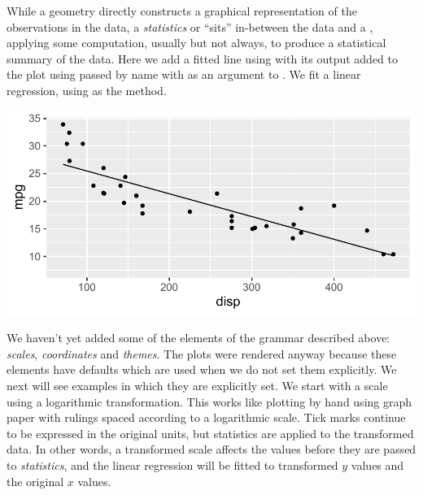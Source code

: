 \documentclass[krantz2]{krantz}\usepackage{knitr}
\begin{document}
While a geometry directly constructs a graphical representation of the observations in the data, a \emph{statistics} or  ``sits'' in-between the data and a , applying some computation, usually but not always, to produce a statistical summary of the data. Here we add a fitted line using  with its output added to the plot using  passed by name with  as an argument to . We fit a linear regression, using  as the method.

\begin{knitrout}\footnotesize
{}\color{fgcolor}\begin{kframe}
\begin{alltt}
\hlstd{(} 
       \hlstd{(}    \hlopt{+}
  \hlstd{()} \hlopt{+}
  \hlstd{(} \hlstd{=} \hlstd{,}  \hlstd{=} \hlstd{,}   \hlopt{~} 
\end{alltt}
\end{kframe}

{\centering \includegraphics[width=.7\textwidth]{figure/pos-ggplot-basics-05-1}

}



\end{knitrout}

We haven't yet added some of the elements of the grammar described above: \emph{scales}, \emph{coordinates} and \emph{themes}. The plots were rendered anyway because these elements have defaults which are used when we do not set them explicitly. We next will see examples in which they are explicitly set. We start with a scale using a logarithmic transformation. This works like plotting by hand using graph paper with rulings spaced according to a logarithmic scale. Tick marks continue to be expressed in the original units, but statistics are applied to the transformed data. In other words, a transformed scale affects the values before they are passed to \emph{statistics}, and the linear regression will be fitted to  transformed $y$ values and the original $x$ values.
\end{document}
